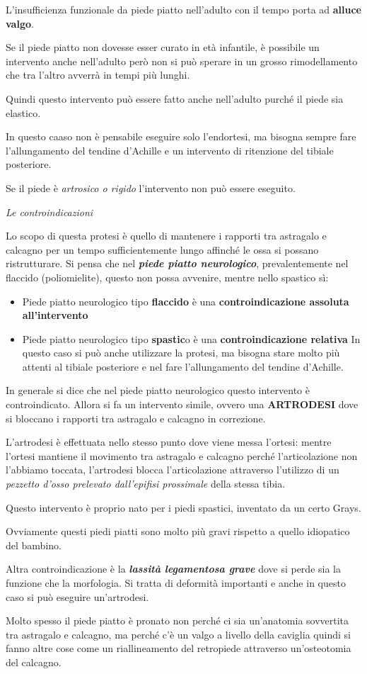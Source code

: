 \documentclass[]{article}
\begin{document}
L'insufficienza funzionale da piede piatto nell'adulto con il tempo
porta ad \textbf{alluce valgo}.

Se il piede piatto non dovesse esser curato in età infantile, è
possibile un intervento anche nell'adulto però non si può sperare in un
grosso rimodellamento che tra l'altro avverrà in tempi più lunghi.

Quindi questo intervento può essere fatto anche nell'adulto purché il
piede sia elastico.

In questo caaso non è pensabile eseguire solo l'endortesi, ma bisogna
sempre fare l'allungamento del tendine d'Achille e un intervento di
ritenzione del tibiale posteriore.

Se il piede è \emph{artrosico o rigido} l'intervento non può essere
eseguito.

\emph{Le controindicazioni}

Lo scopo di questa protesi è quello di mantenere i rapporti tra
astragalo e calcagno per un tempo sufficientemente lungo affinché le
ossa si possano ristrutturare. Si pensa che nel \textbf{\emph{piede
piatto neurologico}}, prevalentemente nel flaccido (poliomielite),
questo non possa avvenire, mentre nello spastico sì:

\begin{itemize}
\item
  Piede piatto neurologico tipo \textbf{flaccido} è una
  \textbf{controindicazione assoluta all'intervento}
\item
  Piede piatto neurologico tipo \textbf{spastic}o è una
  \textbf{controindicazione relativa} In questo caso si può anche
  utilizzare la protesi, ma bisogna stare molto più attenti al tibiale
  posteriore e nel fare l'allungamento del tendine d'Achille.
\end{itemize}

In generale si dice che nel piede piatto neurologico questo intervento è
controindicato. Allora si fa un intervento simile, ovvero una
\textbf{ARTRODESI} dove si bloccano i rapporti tra astragalo e calcagno
in correzione.

L'artrodesi è effettuata nello stesso punto dove viene messa l'ortesi:
mentre l'ortesi mantiene il movimento tra astragalo e calcagno perché
l'articolazione non l'abbiamo toccata, l'artrodesi blocca
l'articolazione attraverso l'utilizzo di un \emph{pezzetto d'osso
prelevato dall'epifisi prossimale} della stessa tibia.

Questo intervento è proprio nato per i piedi spastici, inventato da un
certo Grays.

Ovviamente questi piedi piatti sono molto più gravi rispetto a quello
idiopatico del bambino.

Altra controindicazione è la \textbf{\emph{lassità legamentosa grave}}
dove si perde sia la funzione che la morfologia. Si tratta di deformità
importanti e anche in questo caso si può eseguire un'artrodesi.

Molto spesso il piede piatto è pronato non perché ci sia un'anatomia
sovvertita tra astragalo e calcagno, ma perché c'è un valgo a livello
della caviglia quindi si fanno altre cose come un riallineamento del
retropiede attraverso un'osteotomia del calcagno.
\end{document}

